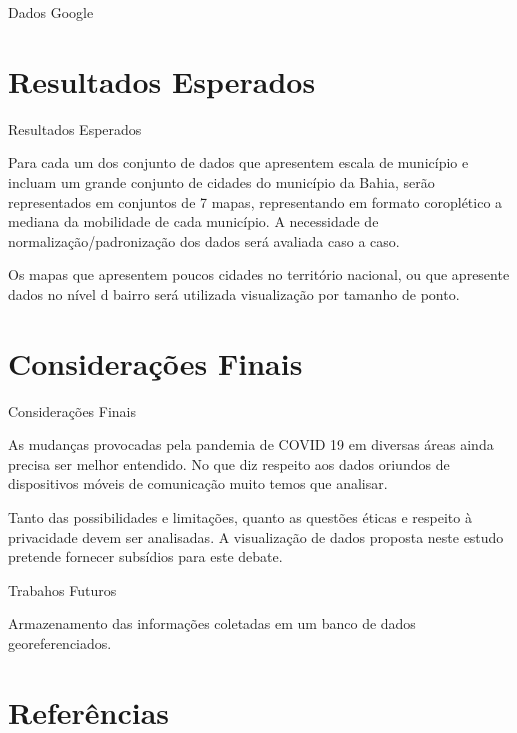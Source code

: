 \documentclass[10pt]{beamer}
\begin{document}
\begin{frame}{Dados Google}




 


\end{frame}


\section{Resultados Esperados}

\begin{frame}{Resultados Esperados}

  Para cada um dos conjunto de dados que apresentem escala de município e incluam um grande conjunto de cidades do município da Bahia, serão representados em conjuntos de 7 mapas, representando em formato coroplético a mediana da mobilidade de cada município. A necessidade de normalização/padronização dos dados será avaliada caso a caso. 

  Os mapas que apresentem poucos cidades no território nacional, ou que apresente dados no nível d bairro será utilizada visualização por tamanho de ponto.
  
\end{frame}

\section{Considerações Finais}

\begin{frame}{Considerações Finais}

  As mudanças provocadas pela pandemia de COVID 19 em diversas áreas ainda precisa ser melhor entendido. No que diz respeito aos dados oriundos de dispositivos móveis de comunicação muito temos que analisar.

  Tanto das possibilidades e limitações, quanto as questões éticas e respeito à privacidade devem ser analisadas. A visualização de dados proposta neste estudo pretende fornecer subsídios para este debate. 


\end{frame}

\begin{frame}{Trabahos Futuros}

  Armazenamento das informações coletadas em um banco de dados georeferenciados.
  
\end{frame}

\section{Referências}

\begin{frame}[allowframebreaks]

  



\end{frame}
\end{document}
